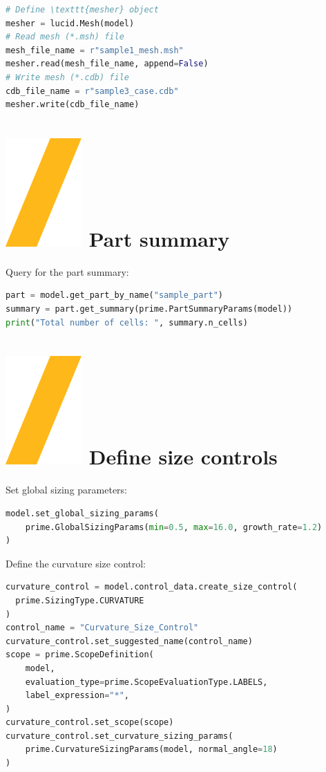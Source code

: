 \documentclass[9pt,landscape]{article}
\begin{document}
\begin{multicols}{3}
\begin{lstlisting}[language=Python]
# Define \texttt{mesher} object
mesher = lucid.Mesh(model)
# Read mesh (*.msh) file
mesh_file_name = r"sample1_mesh.msh"
mesher.read(mesh_file_name, append=False)
# Write mesh (*.cdb) file
cdb_file_name = r"sample3_case.cdb"
mesher.write(cdb_file_name)
\end{lstlisting}

\section{\includegraphics[height=\fontcharht\font`\S]{slash.png} Part summary}
Query for the part summary:
\begin{lstlisting}[language=Python]
part = model.get_part_by_name("sample_part")
summary = part.get_summary(prime.PartSummaryParams(model))
print("Total number of cells: ", summary.n_cells)
\end{lstlisting}

\section{\includegraphics[height=\fontcharht\font`\S]{slash.png} Define size controls}
Set global sizing parameters: 

\begin{lstlisting}[language=Python]
model.set_global_sizing_params(
    prime.GlobalSizingParams(min=0.5, max=16.0, growth_rate=1.2)
)
\end{lstlisting}

Define the curvature size control:
\begin{lstlisting}[language=Python]
curvature_control = model.control_data.create_size_control(
  prime.SizingType.CURVATURE
)
control_name = "Curvature_Size_Control"
curvature_control.set_suggested_name(control_name)
scope = prime.ScopeDefinition(
    model,
    evaluation_type=prime.ScopeEvaluationType.LABELS,
    label_expression="*",
)
curvature_control.set_scope(scope)
curvature_control.set_curvature_sizing_params(
    prime.CurvatureSizingParams(model, normal_angle=18)
)
\end{lstlisting}

\end{multicols}
\end{document}
